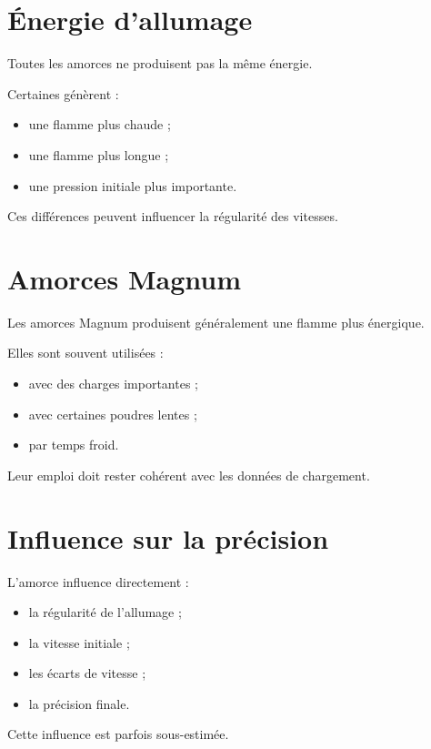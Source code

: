 \section{Énergie d'allumage}

Toutes les amorces ne produisent pas la même énergie.

Certaines génèrent :

\begin{itemize}
    \item une flamme plus chaude ;
    \item une flamme plus longue ;
    \item une pression initiale plus importante.
\end{itemize}

Ces différences peuvent influencer la régularité des vitesses.

\section{Amorces Magnum}

Les amorces Magnum produisent généralement une flamme plus énergique.

Elles sont souvent utilisées :

\begin{itemize}
    \item avec des charges importantes ;
    \item avec certaines poudres lentes ;
    \item par temps froid.
\end{itemize}

Leur emploi doit rester cohérent avec les données de chargement.

\section{Influence sur la précision}

L'amorce influence directement :

\begin{itemize}
    \item la régularité de l'allumage ;
    \item la vitesse initiale ;
    \item les écarts de vitesse ;
    \item la précision finale.
\end{itemize}

Cette influence est parfois sous-estimée.


